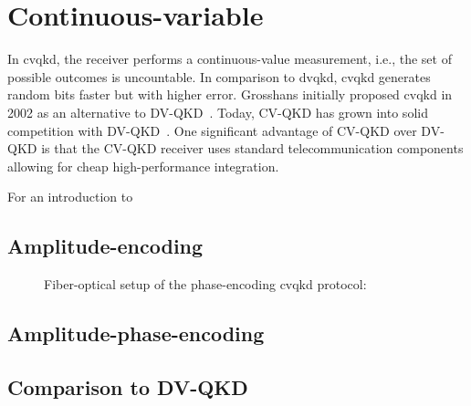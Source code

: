 \section{Continuous-variable}

In \gls{cvqkd}, the receiver performs a continuous-value measurement, i.e., the set of possible outcomes is uncountable.
In comparison to \gls{dvqkd}, \gls{cvqkd} generates random bits faster but with higher error.
Grosshans initially proposed \gls{cvqkd} in 2002 as an alternative to DV-QKD~\cite{Grosshans2002}.
Today, CV-QKD has grown into solid competition with DV-QKD~\cite{Diamanti2016}.
One significant advantage of CV-QKD over DV-QKD is that the CV-QKD receiver uses standard telecommunication components allowing for cheap high-performance integration.

For an introduction to 



\subsection{Amplitude-encoding}

\begin{figure}[htb]
	\centering
	
	\caption{Fiber-optical setup of the phase-encoding \gls{cvqkd} protocol:}
\end{figure}

\subsection{Amplitude-phase-encoding}


\subsection{Comparison to DV-QKD}